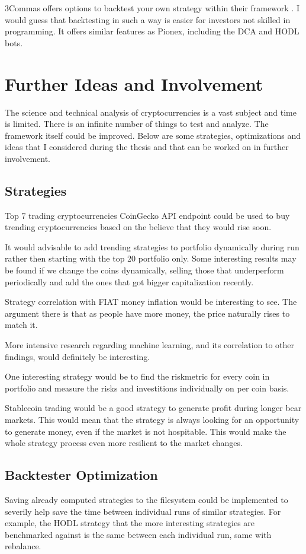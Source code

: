 3Commas offers options to backtest your own strategy within their framework \cite{3commas-trading-view}. I would guess that backtesting in such a way is easier for investors not skilled in programming. It offers similar features as Pionex, including the DCA and HODL bots.


\section{Further Ideas and Involvement}
The science and technical analysis of cryptocurrencies is a vast subject and time is limited. There is an infinite number of things to test and analyze. The framework itself could be improved. Below are some strategies, optimizations and ideas that I considered during the thesis and that can be worked on in further involvement.

\subsection*{Strategies}
Top 7 trading cryptocurrencies CoinGecko API endpoint \cite{coingecko:documentation} could be used to buy trending cryptocurrencies based on the believe that they would rise soon.

It would advisable to add trending strategies to portfolio dynamically during run rather then starting with the top 20 portfolio only. Some interesting results may be found if we change the coins dynamically, selling those that underperform periodically and add the ones that got bigger capitalization recently.

Strategy correlation with FIAT money inflation would be interesting to see. The argument there is that as people have more money, the price naturally rises to match it.

More intensive research regarding machine learning, and its correlation to other findings, would definitely be interesting.

One interesting strategy would be to find the riskmetric for every coin in portfolio and measure the risks and investitions individually on per coin basis.

Stablecoin trading would be a good strategy to generate profit during longer bear markets. This would mean that the strategy is always looking for an opportunity to generate money, even if the market is not hospitable. This would make the whole strategy process even more resilient to the market changes.

\subsection*{Backtester Optimization}
Saving already computed strategies to the filesystem could be implemented to severily help save the time between individual runs of similar strategies. For example, the HODL strategy that the more interesting strategies are benchmarked against is the same between each individual run, same with rebalance.

